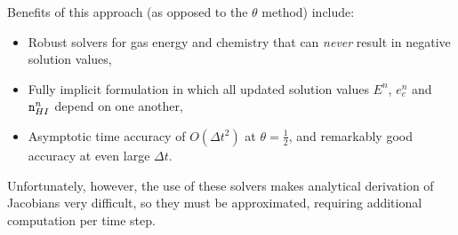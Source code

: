 \documentclass[letterpaper,10pt]{article}
\renewcommand{\(}{\left(}
\renewcommand{\)}{\right)}
\newcommand{\dt}{\Delta t}
\newcommand{\mn}{{\tt n}}
\begin{document}
Benefits of this approach (as opposed to the $\theta$ method) include:
\begin{itemize}
\item Robust solvers for gas energy and chemistry that can {\em never}
  result in negative solution values,
\item Fully implicit formulation in which all updated solution values
  $E^n$, $e_c^n$ and $\mn_{HI}^n$ depend on one another,
\item Asymptotic time accuracy of $O(\dt^2)$ at $\theta=\frac12$,
  and remarkably good accuracy at even large $\dt$.
\end{itemize}
Unfortunately, however, the use of these solvers makes analytical
derivation of Jacobians very difficult, so they must be approximated,
requiring additional computation per time step.
\end{document}
